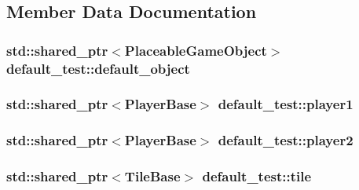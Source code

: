 \subsection{Member Data Documentation}
\hypertarget{classdefault__test_a489e0d429d503fe2eca008af11991d8c}{
\subsubsection[{default\-\_\-object}]{\setlength{\rightskip}{0pt plus 5cm}std\-::shared\-\_\-ptr$<${\bf Placeable\-Game\-Object}$>$ default\-\_\-test\-::default\-\_\-object\hspace{0.3cm}{\ttfamily [private]}}}\label{classdefault__test_a489e0d429d503fe2eca008af11991d8c}
\hypertarget{classdefault__test_afba20ec0117fe62674114d09149417ee}{
\subsubsection[{player1}]{\setlength{\rightskip}{0pt plus 5cm}std\-::shared\-\_\-ptr$<${\bf Player\-Base}$>$ default\-\_\-test\-::player1\hspace{0.3cm}{\ttfamily [private]}}}\label{classdefault__test_afba20ec0117fe62674114d09149417ee}
\hypertarget{classdefault__test_aeadd729801f2defb4838eaafe4349877}{
\subsubsection[{player2}]{\setlength{\rightskip}{0pt plus 5cm}std\-::shared\-\_\-ptr$<${\bf Player\-Base}$>$ default\-\_\-test\-::player2\hspace{0.3cm}{\ttfamily [private]}}}\label{classdefault__test_aeadd729801f2defb4838eaafe4349877}
\hypertarget{classdefault__test_a4d5a5b904e26f3986d6edebdbddeb7c6}{
\subsubsection[{tile}]{\setlength{\rightskip}{0pt plus 5cm}std\-::shared\-\_\-ptr$<${\bf Tile\-Base}$>$ default\-\_\-test\-::tile\hspace{0.3cm}{\ttfamily [private]}}}\label{classdefault__test_a4d5a5b904e26f3986d6edebdbddeb7c6}
